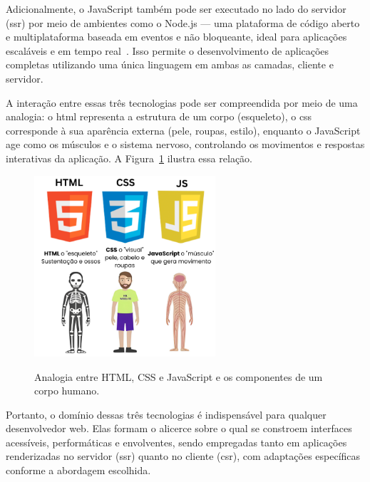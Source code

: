 Adicionalmente, o JavaScript também pode ser executado no lado do servidor (\acrshort{ssr}) por meio de ambientes como o Node.js — uma plataforma de código aberto e multiplataforma baseada em eventos e não bloqueante, ideal para aplicações escaláveis e em tempo real~\cite{nodejs2025, js2025}. Isso permite o desenvolvimento de aplicações completas utilizando uma única linguagem em ambas as camadas, cliente e servidor.

A interação entre essas três tecnologias pode ser compreendida por meio de uma analogia: o \acrshort{html} representa a estrutura de um corpo (esqueleto), o \acrshort{css} corresponde à sua aparência externa (pele, roupas, estilo), enquanto o JavaScript age como os músculos e o sistema nervoso, controlando os movimentos e respostas interativas da aplicação. A Figura~\ref{fig:html-css-js} ilustra essa relação.

\begin{figure}[H]
  \centering
  \caption{Analogia entre HTML, CSS e JavaScript e os componentes de um corpo humano.}
  \includegraphics[width=0.6\textwidth]{media/html_css_js_analogia.png}
  \label{fig:html-css-js}
\end{figure}

Portanto, o domínio dessas três tecnologias é indispensável para qualquer desenvolvedor web. Elas formam o alicerce sobre o qual se constroem interfaces acessíveis, performáticas e envolventes, sendo empregadas tanto em aplicações renderizadas no servidor (\acrshort{ssr}) quanto no cliente (\acrshort{csr}), com adaptações específicas conforme a abordagem escolhida.







